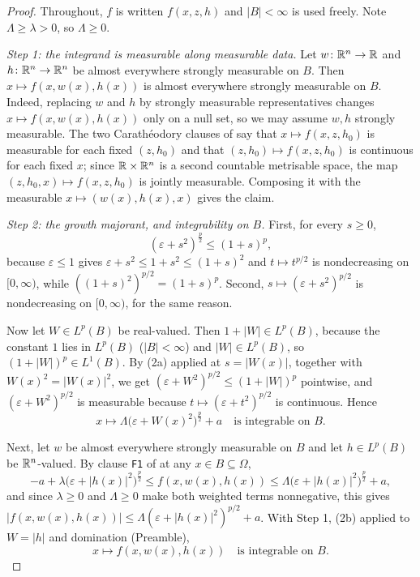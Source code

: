 \begin{proof}
Throughout, $f$ is written $f(x,z,h)$ and $|B|<\infty$ is used freely.  Note
$\Lambda\ge\lambda>0$, so $\Lambda\ge0$.

\emph{Step 1: the integrand is measurable along measurable data.}  Let
$w\colon\mathbb{R}^n\to\mathbb{R}$ and $h\colon\mathbb{R}^n\to\mathbb{R}^n$ be almost everywhere strongly
measurable on $B$.  Then $x\mapsto f(x,w(x),h(x))$ is almost everywhere
strongly measurable on $B$.  Indeed, replacing $w$ and $h$ by strongly
measurable representatives changes $x\mapsto f(x,w(x),h(x))$ only on a null
set, so we may assume $w,h$ strongly measurable.  The two Carath\'eodory
clauses of  say that $x\mapsto f(x,z,h_0)$ is
measurable for each fixed $(z,h_0)$ and that $(z,h_0)\mapsto f(x,z,h_0)$ is
continuous for each fixed $x$; since $\mathbb{R}\times\mathbb{R}^n$ is a second countable
metrisable space, the map $(z,h_0,x)\mapsto f(x,z,h_0)$ is jointly measurable.
Composing it with the measurable $x\mapsto(w(x),h(x),x)$ gives the claim.

\emph{Step 2: the growth majorant, and integrability on $B$.}  First, for every
$s\ge0$,
\[
(\varepsilon+s^2)^{\frac p2}\le(1+s)^{p},
\tag{2a}
\]
because $\varepsilon\le1$ gives $\varepsilon+s^2\le1+s^2\le(1+s)^2$ and
$t\mapsto t^{p/2}$ is nondecreasing on $[0,\infty)$, while
$((1+s)^2)^{p/2}=(1+s)^p$.  Second, $s\mapsto(\varepsilon+s^2)^{p/2}$ is
nondecreasing on $[0,\infty)$, for the same reason.

Now let $W\in L^p(B)$ be real-valued.  Then $1+|W|\in L^p(B)$, because the
constant $1$ lies in $L^p(B)$ ($|B|<\infty$) and $|W|\in L^p(B)$, so
$(1+|W|)^p\in L^1(B)$.  By (2a) applied at $s=|W(x)|$, together with
$W(x)^2=|W(x)|^2$, we get $(\varepsilon+W^2)^{p/2}\le(1+|W|)^p$ pointwise, and
$(\varepsilon+W^2)^{p/2}$ is measurable because $t\mapsto(\varepsilon+t^2)^{p/2}$
is continuous.  Hence
\[
x\mapsto\Lambda\bigl(\varepsilon+W(x)^2\bigr)^{\frac p2}+a
\quad\text{is integrable on }B .
\tag{2b}
\]

Next, let $w$ be almost everywhere strongly measurable on $B$ and let
$h\in L^p(B)$ be $\mathbb{R}^n$-valued.  By clause \texttt{F1} of
 at any $x\in B\subseteq\Omega$,
\[
-a+\lambda\bigl(\varepsilon+|h(x)|^2\bigr)^{\frac p2}\le f(x,w(x),h(x))
\le\Lambda\bigl(\varepsilon+|h(x)|^2\bigr)^{\frac p2}+a ,
\]
and since $\lambda\ge0$ and $\Lambda\ge0$ make both weighted terms
nonnegative, this gives
$|f(x,w(x),h(x))|\le\Lambda(\varepsilon+|h(x)|^2)^{p/2}+a$.  With Step 1, (2b)
applied to $W=|h|$ and domination (Preamble),
\[
x\mapsto f(x,w(x),h(x))\quad\text{is integrable on }B .
\tag{2c}
\]


\end{proof}

